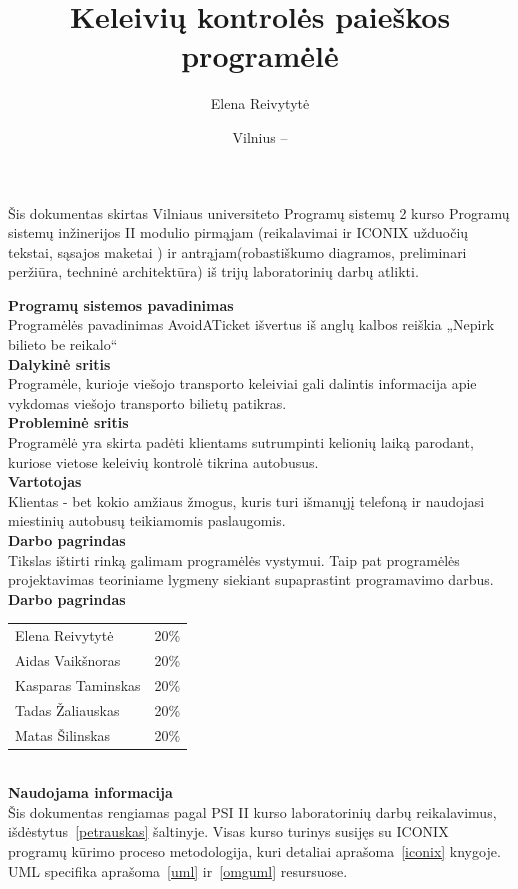 \documentclass{VUMIFPSkursinis}
\title{Keleivių kontrolės paieškos programėlė}
\author{Elena Reivytytė}
\date{Vilnius – \the\year}
\begin{document}
\maketitle

Šis dokumentas skirtas Vilniaus universiteto Programų sistemų 2 kurso Programų sistemų inžinerijos II modulio pirmąjam (reikalavimai ir ICONIX užduočių tekstai, sąsajos maketai ) ir antrąjam(robastiškumo diagramos, preliminari peržiūra, techninė architektūra) iš trijų laboratorinių darbų atlikti.

\tableofcontents

\noindent
\textbf{Programų sistemos pavadinimas}\\
Programėlės pavadinimas AvoidATicket išvertus iš anglų kalbos reiškia „Nepirk bilieto be reikalo“\\
\textbf{Dalykinė sritis}\\
Programėle, kurioje viešojo transporto keleiviai gali dalintis informacija apie vykdomas viešojo transporto bilietų patikras.\\
\textbf{Probleminė sritis}\\
Programėlė yra skirta padėti klientams sutrumpinti kelionių laiką parodant, kuriose vietose keleivių kontrolė tikrina autobusus.\\
\textbf{Vartotojas}\\
Klientas - bet kokio amžiaus žmogus, kuris turi išmanųjį telefoną ir naudojasi miestinių autobusų teikiamomis paslaugomis.\\
\textbf{Darbo pagrindas}\\
Tikslas ištirti rinką galimam programėlės vystymui. Taip pat programėlės projektavimas teoriniame lygmeny siekiant supaprastint programavimo darbus.\\
\textbf{Darbo pagrindas}\\
\begin{tabular}{lr}
   Elena Reivytytė & 20\% \\
   Aidas Vaikšnoras & 20\% \\
   Kasparas Taminskas & 20\% \\
   Tadas Žaliauskas & 20\% \\
   Matas Šilinskas & 20\% \\
\end{tabular}
\\
\textbf{Naudojama informacija}\\
Šis dokumentas rengiamas pagal PSI II kurso laboratorinių darbų reikalavimus, išdėstytus~\ref{petrauskas} šaltinyje. Visas kurso turinys susijęs su ICONIX programų kūrimo proceso metodologija,
kuri detaliai aprašoma~\ref{iconix} knygoje. UML specifika aprašoma~\ref{uml} ir~\ref{omguml} resursuose.
\end{document}

